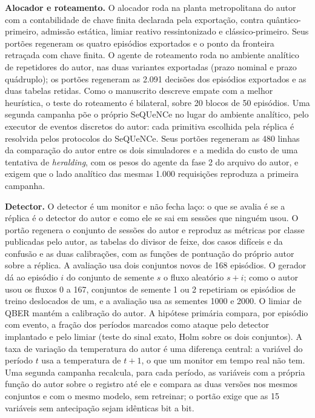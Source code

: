 \documentclass[12pt]{article}
\begin{document}
\textbf{Alocador e roteamento.} O alocador roda na planta metropolitana do autor
com a contabilidade de chave finita declarada pela exportação, contra
quântico-primeiro, admissão estática, limiar reativo ressintonizado e
clássico-primeiro. Seus portões regeneram os quatro episódios exportados e o
ponto da fronteira retraçada com chave finita. O agente de roteamento roda no
ambiente analítico de repetidores do autor, nas duas variantes exportadas
(prazo nominal e prazo quádruplo); os portões regeneram as 2.091 decisões dos
episódios exportados e as duas tabelas retidas. Como o manuscrito descreve
empate com a melhor heurística, o teste do roteamento é bilateral, sobre 20
blocos de 50 episódios. Uma segunda campanha põe o próprio SeQUeNCe no lugar do
ambiente analítico, pelo executor de eventos discretos do autor: cada primitiva
escolhida pela réplica é resolvida pelos protocolos do SeQUeNCe. Seus portões
regeneram as 480 linhas da comparação do autor entre os dois simuladores e a
medida do custo de uma tentativa de \textit{heralding}, com os pesos do agente da
fase 2 do arquivo do autor, e exigem que o lado analítico das mesmas 1.000
requisições reproduza a primeira campanha.

\textbf{Detector.} O detector é um monitor e não fecha laço: o que se avalia é
se a réplica é o detector do autor e como ele se sai em sessões que ninguém usou.
O portão regenera o conjunto de sessões do autor e reproduz as métricas por
classe publicadas pelo autor, as tabelas do divisor de feixe, dos casos
difíceis e da confusão e as duas calibrações, com as funções de pontuação do
próprio autor sobre a réplica. A avaliação usa dois conjuntos novos de 168
episódios. O gerador dá ao episódio $i$ do conjunto de semente $s$ o fluxo
aleatório $s+i$; como o autor usou os fluxos 0 a 167, conjuntos de semente 1 ou 2
repetiriam os episódios de treino deslocados de um, e a avaliação usa as
sementes 1000 e 2000. O limiar de QBER mantém a calibração do autor. A hipótese
primária compara, por episódio com evento, a fração dos períodos marcados como
ataque pelo detector implantado e pelo limiar (teste do sinal exato, Holm sobre
os dois conjuntos). A taxa de variação da temperatura do autor é uma diferença
central: a variável do período $t$ usa a temperatura de $t+1$, o que um monitor em
tempo real não tem. Uma segunda campanha recalcula, para cada período, as
variáveis com a própria função do autor sobre o registro até ele e compara as duas
versões nos mesmos conjuntos e com o mesmo modelo, sem retreinar; o portão exige
que as 15 variáveis sem antecipação sejam idênticas bit a bit.
\end{document}
